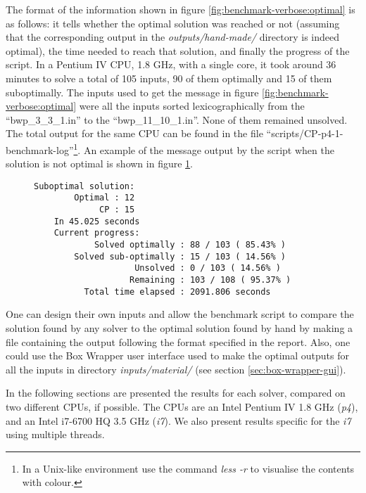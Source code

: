 The format of the information shown in figure \ref{fig:benchmark-verbose:optimal}
is as follows: it tells whether the optimal solution was reached or not (assuming
that the corresponding output in the \textit{outputs/hand-made/} directory is indeed
optimal), the time needed to reach that solution, and finally the progress of the
script. In a Pentium IV CPU, 1.8 GHz, with a single core, it took around 36 minutes
to solve a total of 105 inputs, 90 of them optimally and 15 of them suboptimally.
The inputs used to get the message in figure \ref{fig:benchmark-verbose:optimal} were
all the inputs sorted lexicographically from the ``bwp\_3\_3\_1.in'' to the
``bwp\_11\_10\_1.in''. None of them remained unsolved. The total output for the
same CPU can be found in the file ``scripts/CP-p4-1-benchmark-log''\footnote{ In a
Unix-like environment use the command \textit{less -r} to visualise the contents with colour.}.
An example of the message output by the script when the solution is not optimal is
shown in figure \ref{fig:benchmark-verbose:suboptimal}.

\begin{figure}[H]
\centering
{\scriptsize
\begin{BVerbatim}
Suboptimal solution:
        Optimal : 12
             CP : 15
    In 45.025 seconds
    Current progress:
            Solved optimally : 88 / 103 ( 85.43%
        Solved sub-optimally : 15 / 103 ( 14.56%
                    Unsolved : 0 / 103 ( 14.56%
                   Remaining : 103 / 108 ( 95.37%
          Total time elapsed : 2091.806 seconds

\end{BVerbatim}
}
\label{fig:benchmark-verbose:suboptimal}
\end{figure}

\hfill

One can design their own inputs and allow the benchmark script to compare
the solution found by any solver to the optimal solution found by hand by
making a file containing the output following the format specified in the
report. Also, one could use the Box Wrapper user interface used to make the
optimal outputs for all the inputs in directory \textit{inputs/material/}
(see section \ref{sec:box-wrapper-gui}).

\hfill

In the following sections are presented the results for each solver, compared
on two different CPUs, if possible. The CPUs are an Intel Pentium IV 1.8 GHz
(\textit{p4}), and an Intel i7-6700 HQ 3.5 GHz (\textit{i7}). We also present
results specific for the \textit{i7} using multiple threads.

